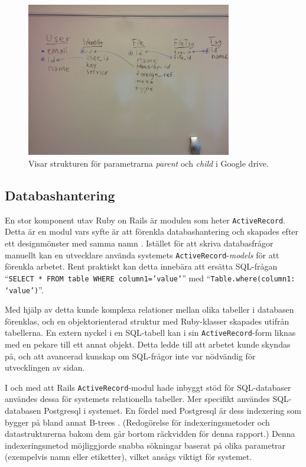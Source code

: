 \begin{figure}[!H]
\centering
\includegraphics[width=0.8\textwidth]{figures/relations.jpg}
\caption{Visar strukturen för parametrarna \textit{parent} och \textit{child} i Google drive.}
\label{fig:relations}
\end{figure}

\subsection{Databashantering}
En stor komponent utav Ruby on Rails är modulen som heter \texttt{ActiveRecord}. Detta är en modul vars syfte är att förenkla databashantering \cite{objrel} och skapades efter ett designmönster med samma namn \cite{proar}. Istället för att skriva databasfrågor manuellt kan en utvecklare använda systemets \texttt{ActiveRecord}-\textit{models} för att förenkla arbetet. Rent praktiskt kan detta innebära att ersätta SQL-frågan “\texttt{SELECT * FROM table WHERE column1=’value’}” med “\texttt{Table.where(column1: ‘value’)}”.

Med hjälp av detta kunde komplexa relationer mellan olika tabeller i databasen förenklas, och en objektorienterad struktur med Ruby-klasser skapades utifrån tabellerna. En extern nyckel i en SQL-tabell kan i sin \texttt{ActiveRecord}-form liknas med en pekare till ett annat objekt. Detta ledde till att arbetet kunde skyndas på, och att avancerad kunskap om SQL-frågor inte var nödvändig för utvecklingen av sidan.

I och med att Rails \texttt{ActiveRecord}-modul hade inbyggt stöd för SQL-databaser användes dessa för systemets relationella tabeller. Mer specifikt användes SQL-databasen Postgresql i systemet. En fördel med Postgresql är dess indexering som bygger på bland annat B-trees \cite{indexes}. (Redogörelse för indexeringsmetoder och datastrukturerna bakom dem går bortom räckvidden för denna rapport.) Denna indexeringsmetod möjliggjorde snabba sökningar baserat på olika parametrar (exempelvis namn eller etiketter), vilket ansågs viktigt för systemet.

